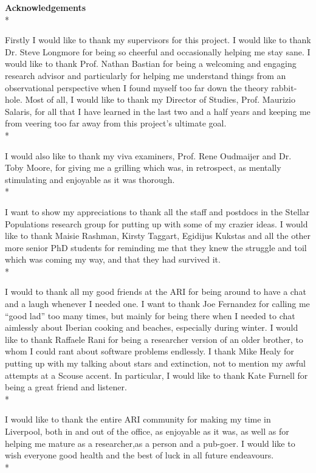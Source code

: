 \documentclass[12pt, a4paper]{report}
\begin{document}
\newpage

\textbf{Acknowledgements}\\*

Firstly I would like to thank my supervisors for this project. I would like to thank Dr. Steve Longmore for being so cheerful and occasionally helping me stay sane. I would like to thank Prof. Nathan Bastian for being a welcoming and engaging research advisor and particularly for helping me understand things from an observational perspective when I found myself too far down the theory rabbit-hole. Most of all, I would like to thank my Director of Studies, Prof. Maurizio Salaris, for all that I have learned in the last two and a half years and keeping me from veering too far away from this project's ultimate goal.\\*

I would also like to thank my viva examiners, Prof. Rene Oudmaijer and Dr. Toby Moore, for giving me a grilling which was, in retrospect, as mentally stimulating and enjoyable as it was thorough.\\*

I want to show my appreciations to thank all the staff and postdocs in the Stellar Populations research group for putting up with some of my crazier ideas. I would like to thank Maisie Rashman, Kirsty Taggart, Egidijus Kukstas and all the other more senior PhD students for reminding me that they knew the struggle and toil which was coming my way, and that they had survived it.\\*

I would to thank all my good friends at the ARI for being around to have a chat and a laugh whenever I needed one. I want to thank Joe Fernandez for calling me ``good lad'' too many times, but mainly for being there when I needed to chat aimlessly about Iberian cooking and beaches, especially during winter. I would like to thank Raffaele Rani for being a researcher version of an older brother, to whom I could rant about software problems endlessly. I thank Mike Healy for putting up with my talking about stars and extinction, not to mention my awful attempts at a Scouse accent. In particular, I would like to thank Kate Furnell for being a great friend and listener.\\*

I would like to thank the entire ARI community for making my time in Liverpool, both in and out of the office, as enjoyable as it was, as well as for helping me mature as a researcher,as a person and a pub-goer. I would like to wish everyone good health and the best of luck in all future endeavours.\\*
\end{document}
